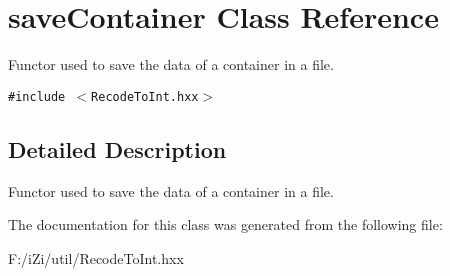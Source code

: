 \section{save\-Container Class Reference}
\label{classsave_container}
Functor used to save the data of a container in a file.  


{\tt \#include $<$Recode\-To\-Int.hxx$>$}



\subsection{Detailed Description}
Functor used to save the data of a container in a file. 



The documentation for this class was generated from the following file:\begin{CompactItemize}
\item 
F:/i\-Zi/util/Recode\-To\-Int.hxx\end{CompactItemize}

